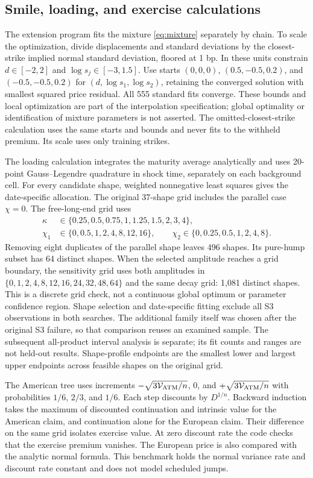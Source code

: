 \subsection{Smile, loading, and exercise calculations}\label{app:empiricalmethod}
The extension program fits the mixture \eqref{eq:mixture} separately by chain. To scale the optimization, divide displacements and standard deviations by the closest-strike implied normal standard deviation, floored at 1 bp. In these units constrain $d\in[-2,2]$ and $\log s_j\in[-3,1.5]$. Use starts $(0,0,0)$, $(0.5,-0.5,0.2)$, and $(-0.5,-0.5,0.2)$ for $(d,\log s_1,\log s_2)$, retaining the converged solution with smallest squared price residual. All 555 standard fits converge. These bounds and local optimization are part of the interpolation specification; global optimality or identification of mixture parameters is not asserted. The omitted-closest-strike calculation uses the same starts and bounds and never fits to the withheld premium. Its scale uses only training strikes.

The loading calculation integrates the maturity average analytically and uses 20-point Gauss--Legendre quadrature in shock time, separately on each background cell. For every candidate shape, weighted nonnegative least squares gives the date-specific allocation. The original 37-shape grid includes the parallel case $\chi=0$. The free-long-end grid uses
\begin{align*}
\kappa&\in\{0.25,0.5,0.75,1,1.25,1.5,2,3,4\},\\
\chi_1&\in\{0,0.5,1,2,4,8,12,16\},\qquad
\chi_2\in\{0,0.25,0.5,1,2,4,8\}.
\end{align*}
Removing eight duplicates of the parallel shape leaves 496 shapes. Its pure-hump subset has 64 distinct shapes. When the selected amplitude reaches a grid boundary, the sensitivity grid uses both amplitudes in $\{0,1,2,4,8,12,16,24,32,48,64\}$ and the same decay grid: 1,081 distinct shapes. This is a discrete grid check, not a continuous global optimum or parameter confidence region. Shape selection and date-specific fitting exclude all S3 observations in both searches. The additional family itself was chosen after the original S3 failure, so that comparison reuses an examined sample. The subsequent all-product interval analysis is separate; its fit counts and ranges are not held-out results. Shape-profile endpoints are the smallest lower and largest upper endpoints across feasible shapes on the original grid.

The American tree uses increments $-\sqrt{3\mathcal V_{\rm ATM}/n}$, $0$, and $+\sqrt{3\mathcal V_{\rm ATM}/n}$ with probabilities $1/6$, $2/3$, and $1/6$. Each step discounts by $D^{1/n}$. Backward induction takes the maximum of discounted continuation and intrinsic value for the American claim, and continuation alone for the European claim. Their difference on the same grid isolates exercise value. At zero discount rate the code checks that the exercise premium vanishes. The European price is also compared with the analytic normal formula. This benchmark holds the normal variance rate and discount rate constant and does not model scheduled jumps.

